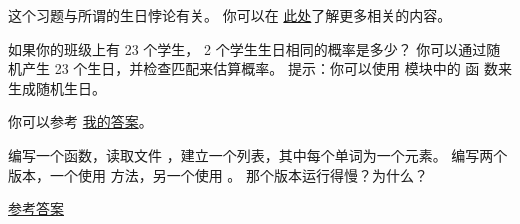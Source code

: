 \begin{exercise}


这个习题与所谓的生日悖论有关。
你可以在 \href{http://en.wikipedia.org/wiki/Birthday_paradox}{此处}了解更多相关的内容。


如果你的班级上有 23 个学生， 2 个学生生日相同的概率是多少？
你可以通过随机产生 23 个生日，并检查匹配来估算概率。
提示：你可以使用  模块中的  函
数来生成随机生日。

  
  


你可以参考 \href{http://thinkpython2.com/code/birthday.py}{我的答案}。

\end{exercise}



\begin{exercise}
  
  


编写一个函数，读取文件 ，建立一个列表，其中每个单词为一个元素。
编写两个版本，一个使用  方法，另一个使用 。
那个版本运行得慢？为什么？


\href{http://thinkpython2.com/code/wordlist.py}{参考答案}

  

\end{exercise}


